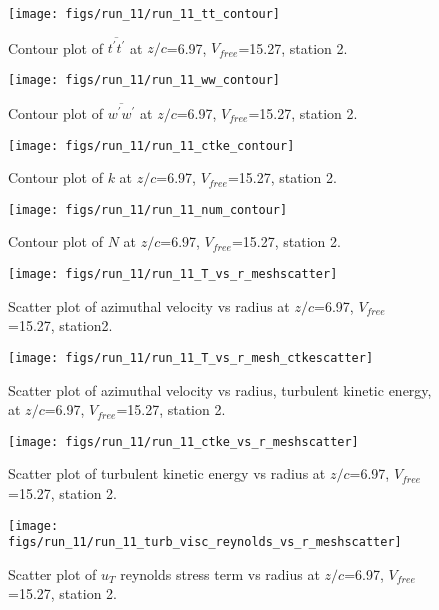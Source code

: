 \begin{figure}[H]
\centering
\texttt{[image: figs/run\_11/run\_11\_tt\_contour]}
\caption{Contour plot of $\overline{t^\prime t^\prime}$ at $z/c$=6.97, $V_{free}$=15.27, station 2.}
\end{figure}


\begin{figure}[H]
\centering
\texttt{[image: figs/run\_11/run\_11\_ww\_contour]}
\caption{Contour plot of $\overline{w^\prime w^\prime}$ at $z/c$=6.97, $V_{free}$=15.27, station 2.}
\end{figure}


\begin{figure}[H]
\centering
\texttt{[image: figs/run\_11/run\_11\_ctke\_contour]}
\caption{Contour plot of $k$ at $z/c$=6.97, $V_{free}$=15.27, station 2.}
\end{figure}


\begin{figure}[H]
\centering
\texttt{[image: figs/run\_11/run\_11\_num\_contour]}
\caption{Contour plot of $N$ at $z/c$=6.97, $V_{free}$=15.27, station 2.}
\end{figure}


\begin{figure}[H]
\centering
\texttt{[image: figs/run\_11/run\_11\_T\_vs\_r\_meshscatter]}
\caption{Scatter plot of azimuthal velocity vs radius at $z/c$=6.97, $V_{free}$=15.27, station2.}
\end{figure}


\begin{figure}[H]
\centering
\texttt{[image: figs/run\_11/run\_11\_T\_vs\_r\_mesh\_ctkescatter]}
\caption{Scatter plot of azimuthal velocity vs radius, turbulent kinetic energy, at $z/c$=6.97, $V_{free}$=15.27, station 2.}
\end{figure}


\begin{figure}[H]
\centering
\texttt{[image: figs/run\_11/run\_11\_ctke\_vs\_r\_meshscatter]}
\caption{Scatter plot of turbulent kinetic energy vs radius at $z/c$=6.97, $V_{free}$=15.27, station 2.}
\end{figure}


\begin{figure}[H]
\centering
\texttt{[image: figs/run\_11/run\_11\_turb\_visc\_reynolds\_vs\_r\_meshscatter]}
\caption{Scatter plot of $
u_T$ reynolds stress term vs radius at $z/c$=6.97, $V_{free}$=15.27, station 2.}
\end{figure}


